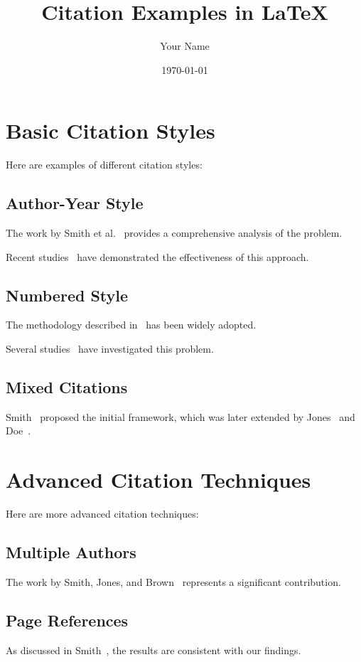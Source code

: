 \documentclass{article}
\title{Citation Examples in LaTeX}
\author{Your Name}
\date{\today}
\begin{document}
\maketitle

\section{Basic Citation Styles}
Here are examples of different citation styles:

\subsection{Author-Year Style}
The work by Smith et al.~\cite{smith2023} provides a comprehensive analysis of the problem.

Recent studies~\cite{jones2022,doe2023} have demonstrated the effectiveness of this approach.

\subsection{Numbered Style}
The methodology described in~\cite{smith2023} has been widely adopted.

Several studies~\cite{jones2022,doe2023,brown2021} have investigated this problem.

\subsection{Mixed Citations}
Smith~\cite{smith2023} proposed the initial framework, which was later extended by Jones~\cite{jones2022} and Doe~\cite{doe2023}.

\section{Advanced Citation Techniques}
Here are more advanced citation techniques:

\subsection{Multiple Authors}
The work by Smith, Jones, and Brown~\cite{smith2023} represents a significant contribution.

\subsection{Page References}
As discussed in Smith~\cite[pp. 123-125]{smith2023}, the results are consistent with our findings.
\end{document}
